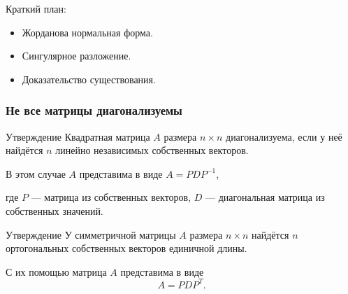 
\begin{frame} %


\end{frame}



\begin{frame}{Краткий план:}
  \begin{itemize}[<+->]
    \item Жорданова нормальная форма.
    \item Сингулярное разложение.
    \item Доказательство существования.
  \end{itemize}

\end{frame}


\begin{frame}
  \frametitle{Не все матрицы диагонализуемы}

  \begin{block}{Утверждение}
    Квадратная матрица $A$ размера $n\times n$ диагонализуема, если у неё найдётся $n$ линейно независимых собственных векторов.

    В этом случае $A$ представима в виде $A  =  P D P^{-1}$,

    где $P$ — матрица из собственных векторов, $D$ — диагональная матрица из собственных значений. \pause
  \end{block}

  \begin{block}{Утверждение}
    У симметричной матрицы $A$ размера $n\times n$ найдётся $n$ ортогональных собственных векторов единичной длины.

    С их помощью матрица $A$ представима в виде
    \[
    A = P D P^T.      
    \]
  \end{block}


\end{frame}



